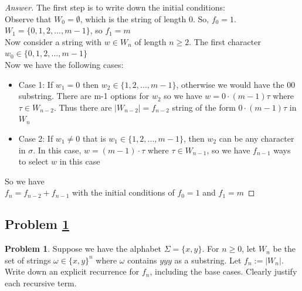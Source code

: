 \documentclass[11pt]{article}
\theoremstyle{definition}
\theoremstyle{definition}
\newtheorem{required}{Problem}
\theoremstyle{definition}
\begin{document}
\begin{proof}[Answer]

The first step is to write down the initial conditions: \\
Observe that $W_0 = {\emptyset}$, which is the string of length 0. So, $f_0 = 1$. \\
$W_1 = \{0,1,2, ... , m-1\}$, so  $f_1 = m$ \\

Now consider a string with  $w \in W_{n}$  of length $n \geq 2$. The first character $w_0 \in  \{0,1,2, ... , m-1\}$ \\
Now we have the following cases:
\begin{itemize}
\item Case 1: If $w_1 = 0$ then $w_2 \in  \{1,2, ... , m-1\}$, otherwise we would have the 00 substring. There are m-1 options for $w_2$ so we have $w= 0\cdot (m-1) \tau$ where $\tau \in W_{n-2}$. Thus there are $|W_{n-2}| = f_{n-2}$ string of the form $ 0\cdot (m-1) \tau$ in $W_n$
\item Case 2: If $w_1 \neq 0 $ that is $w_1 \in  \{1,2, ... , m-1\}$, then $w_2$ can be any character in $\sigma$. In this case, $w=(m-1)\cdot \tau$ where  $\tau \in W_{n-1}$, so we have $f_{n-1}$ ways to select $w$ in this case
\end{itemize}

So we have \\
$f_n= f_{n-2}+f_{n-1}$ with the initial conditions of  $f_0 = 1$ and $f_1 = m$ 

\end{proof}

\newpage
\subsection{Problem \ref{DP4}}

\begin{required} \label{DP4}
Suppose we have the alphabet $\Sigma = \{x, y\}$. For $n \geq 0$, let $W_{n}$ be the set of strings $\omega \in \{x, y\}^{n}$ where $\omega$ contains $yyy$ as a substring. Let $f_{n} := |W_{n}|$. Write down an explicit recurrence for $f_{n}$, including the base cases. Clearly justify each recursive term.
\end{required}
\end{document}
